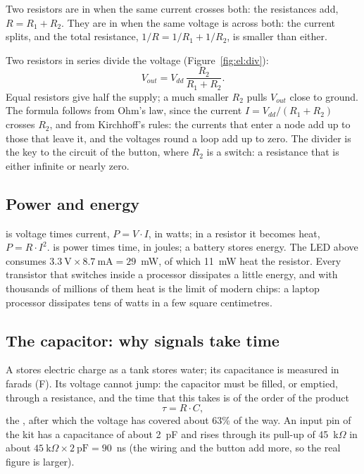 Two resistors are in  when the same current crosses both: the
resistances add, $R=R_1+R_2$. They are in  when the same
voltage is across both: the current splits, and the total resistance,
$1/R=1/R_1+1/R_2$, is smaller than either.

Two resistors in series divide the voltage (Figure~\ref{fig:el:div}):
\begin{equation}\label{eq:el:div}
V_{out} = V_{dd}\,\frac{R_2}{R_1+R_2}.
\end{equation}
Equal resistors give half the supply; a much smaller $R_2$ pulls $V_{out}$
close to ground. The formula follows from Ohm's law, since the current
$I=V_{dd}/(R_1+R_2)$ crosses $R_2$, and from Kirchhoff's rules: the currents
that enter a node add up to those that leave it, and the voltages round a loop
add up to zero. The divider is the key to the circuit of the button, where
$R_2$ is a switch: a resistance that is either infinite or nearly zero.

\subsection{Power and energy}

 is voltage times current, $P=V\cdot I$, in watts; in a resistor
it becomes heat, $P=R\cdot I^{2}$.  is power times time, in
joules; a battery stores energy. The LED above consumes
$3.3\ \mathrm{V}\times 8.7\ \mathrm{mA} = 29$~mW, of which 11~mW heat the
resistor. Every transistor that switches inside a processor dissipates a
little energy, and with thousands of millions of them heat is the limit of
modern chips: a laptop processor dissipates tens of watts in a few square
centimetres.

\subsection{The capacitor: why signals take time}

A  stores electric charge as a tank stores water; its
capacitance is measured in farads (F). Its voltage cannot jump: the capacitor
must be filled, or emptied, through a resistance, and the time that this
takes is of the order of the product
\[ \tau = R\cdot C, \]
the , after which the voltage has covered about 63\% of
the way. An input pin of the kit has a capacitance of about 2~pF and rises
through its pull-up of 45~k$\Omega$ in about
$45\ \mathrm{k}\Omega\times 2\ \mathrm{pF}=90$~ns (the wiring and the button
add more, so the real figure is larger).

